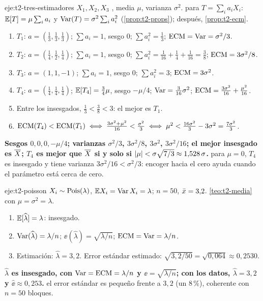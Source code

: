 \begin{solucion}{eje:t2-tres-estimadores}
\datos $X_1,X_2,X_3$ \iid, media $\mu$, varianza $\sigma^{2}$.
\planteamiento para $T=\sum_ia_iX_i$: $\mathbb{E}[T]=\mu\sum_ia_i$ y $\operatorname{Var}(T)=\sigma^{2}\sum_ia_i^{2}$ (\cref{prop:t2-props}); después, \cref{prop:t2-ecm}.
\pasos
\begin{enumerate}[label=\arabic*.]
  \item $T_1$: $a=(\frac13,\frac13,\frac13)$; $\sum a_i=1$, sesgo $0$; $\sum a_i^{2}=\frac13$; $\operatorname{ECM}=\operatorname{Var}=\sigma^{2}/3$.
  \item $T_2$: $a=(\frac14,\frac12,\frac14)$; $\sum a_i=1$, sesgo $0$; $\sum a_i^{2}=\frac1{16}+\frac14+\frac1{16}=\frac38$; $\operatorname{ECM}=3\sigma^{2}/8$.
  \item $T_3$: $a=(1,1,-1)$; $\sum a_i=1$, sesgo $0$; $\sum a_i^{2}=3$; $\operatorname{ECM}=3\sigma^{2}$.
  \item $T_4$: $a=(\frac14,\frac14,\frac14)$; $\mathbb{E}[T_4]=\frac34\mu$, sesgo $-\mu/4$; $\operatorname{Var}=\frac3{16}\sigma^{2}$; $\operatorname{ECM}=\frac{3\sigma^{2}}{16}+\frac{\mu^{2}}{16}$.
  \item Entre los insesgados, $\frac13<\frac38<3$: el mejor es $T_1$.
  \item $\operatorname{ECM}(T_4)<\operatorname{ECM}(T_1)\iff\frac{3\sigma^{2}+\mu^{2}}{16}<\frac{\sigma^{2}}{3}\iff\mu^{2}<\frac{16\sigma^{2}}{3}-3\sigma^{2}=\frac{7\sigma^{2}}{3}$.
\end{enumerate}
\resultado \textbf{Sesgos $0,0,0,-\mu/4$; varianzas $\sigma^{2}/3$, $3\sigma^{2}/8$, $3\sigma^{2}$, $3\sigma^{2}/16$; el mejor insesgado es $\overline{X}$; $T_4$ es mejor que $\overline{X}$ si y solo si $\lvert\mu\rvert<\sigma\sqrt{7/3}\approx1{,}528\,\sigma$.}
\comprobacion para $\mu=0$, $T_4$ es insesgado y tiene varianza $3\sigma^{2}/16<\sigma^{2}/3$: encoger hacia el cero ayuda cuando el parámetro está cerca de cero.
\end{solucion}

\begin{solucion}{eje:t2-poisson}
\datos $X_i\sim\operatorname{Pois}(\lambda)$, $\mathbb{E} X_i=\operatorname{Var} X_i=\lambda$; $n=50$, $\bar{x}=3{,}2$.
\planteamiento \cref{teo:t2-media} con $\mu=\sigma^{2}=\lambda$.
\pasos
\begin{enumerate}[label=\arabic*.]
  \item $\mathbb{E}[\widehat\lambda]=\lambda$: insesgado.
  \item $\operatorname{Var}(\widehat\lambda)=\lambda/n$; $\ee(\widehat\lambda)=\sqrt{\lambda/n}$; $\operatorname{ECM}=\operatorname{Var}=\lambda/n$.
  \item Estimación: $\widehat\lambda=3{,}2$. Error estándar estimado: $\sqrt{3{,}2/50}=\sqrt{0{,}064}\approx0{,}2530$.
\end{enumerate}
\resultado \textbf{$\widehat\lambda$ es insesgado, con $\operatorname{Var}=\operatorname{ECM}=\lambda/n$ y $\ee=\sqrt{\lambda/n}$; con los datos, $\widehat\lambda=3{,}2$ y $\widehat{\ee}\approx0{,}253$.}
\comprobacion el error estándar es pequeño frente a $3{,}2$ (un $8\,\%$), coherente con $n=50$ bloques.
\end{solucion}

